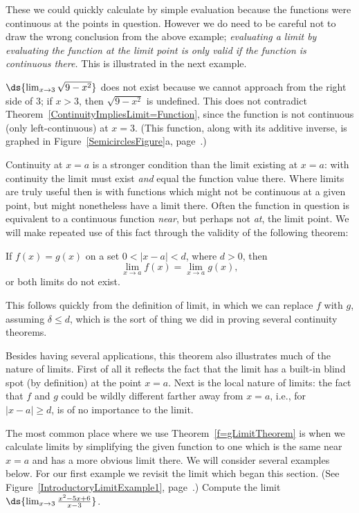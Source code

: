 \noindent These we could quickly calculate by simple evaluation
because the functions were continuous at the points in question.
However we do need to be careful not to draw the wrong conclusion
from the above example; {\it evaluating a limit by evaluating the 
function at the limit point is only valid if the 
function is continuous there.}  This is illustrated in the next
example.

\bex $\ds{\lim_{x\to3}\sqrt{9-x^2}}$ does not exist
because we cannot approach from the  right side of $3$;
if $x>3$, then $\sqrt{9-x^2}$ is undefined. This does
not contradict Theorem~\ref{ContinuityImpliesLimit=Function},
since the function is not continuous (only left-continuous)
at $x=3$. (This function, along with its additive inverse, is graphed in
{\rm Figure~\ref{SemicirclesFigure}a}, page~\pageref{SemicirclesFigure}.)
\eex

Continuity at $x=a$ is a stronger condition than 
the limit existing at $x=a$: with continuity the
limit must exist {\it and} equal the function value there.
Where limits are truly useful then is with functions which
might not be continuous at a given point, but might
nonetheless have a limit there. Often the function in
question is equivalent to a continuous function {\it near},
but perhaps not {\it at}, the limit point.
We will make repeated use of this fact through
the validity of the following theorem:

\begin{theorem} If $f(x)=g(x)$ on a set $0<|x-a|<d$,
where $d>0$, then
$$\lim_{x\to a}f(x)=\lim_{x\to a}g(x),$$
or both limits do not exist.
\label{f=gLimitTheorem}\end{theorem}

This follows quickly from the definition of limit,
in which we can replace $f$ with $g$, assuming
$\delta\le d$, which is the sort of thing we did in
proving several continuity theorems.

Besides having several applications, this theorem also 
illustrates much of the nature of limits.  First of
all it reflects the fact that the limit has a built-in 
blind spot (by definition) at the point $x=a$.
Next is the local nature of limits:
the fact that $f$ and $g$ could be wildly different
farther away from $x=a$, i.e., for $|x-a|\ge d$,
is of no importance to the limit. 

The most common place where we use Theorem~\ref{f=gLimitTheorem}
is when we calculate limits by simplifying the given function
to one which is the same near $x=a$ and has a more obvious
limit there.  We will consider several examples below.
For our first example we revisit the limit which began this section.
(See Figure~\ref{IntroductoryLimitExample1}, 
page~\pageref{IntroductoryLimitExample1}.)
\bex Compute the limit $\ds{\lim_{x\to3}\frac{x^2-5x+6}{x-3}}$.

